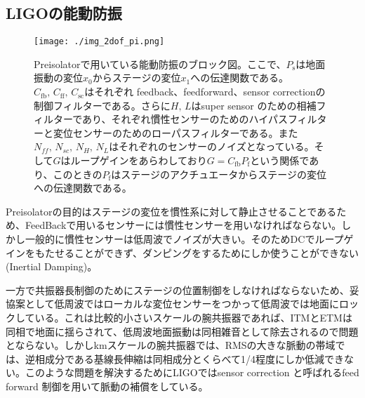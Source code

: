 \documentclass[a4paper,12pt]{jsarticle}
\begin{document}
\subsection{LIGOの能動防振}
\begin{figure}[H]
  \begin{center}
    \texttt{[image: ./img\_2dof\_pi.png]}
  \end{center}
  \caption{Preisolatorで用いている能動防振のブロック図。ここで、$P_{\mathrm{s}}$は地面振動の変位$x_0$からステージの変位$x_1$への伝達関数である。$C_{\mathrm{fb}},\,C_{\mathrm{ff}},\,C_{\mathrm{sc}}$はそれぞれ feedback、feedforward、sensor correctionの制御フィルターである。さらに$H,\,L$はsuper sensor のための相補フィルターであり、それぞれ慣性センサーのためのハイパスフィルターと変位センサーのためのローパスフィルターである。また$N_{ff},\,N_{sc},\,N_{H},\,N_{L}$はそれぞれのセンサーのノイズとなっている。そして$G$はループゲインをあらわしており$G=C_{\mathrm{fb}}P_{\mathrm{f}}$という関係であり、このときの$P_{\mathrm{f}}$はステージのアクチュエータからステージの変位への伝達関数である。}\label{img:img_2dof_pi}
\end{figure}

Preisolatorの目的はステージの変位を慣性系に対して静止させることであるため、FeedBackで用いるセンサーには慣性センサーを用いなければならない。しかし一般的に慣性センサーは低周波でノイズが大きい。そのためDCでループゲインをもたせることができず、ダンピングをするためにしか使うことができない(Inertial Damping)。

一方で共振器長制御のためにステージの位置制御をしなければならないため、妥協案として低周波ではローカルな変位センサーをつかって低周波では地面にロックしている。これは比較的小さいスケールの腕共振器であれば、ITMとETMは同相で地面に揺らされて、低周波地面振動は同相雑音として除去されるので問題とならない。しかしkmスケールの腕共振器では、RMSの大きな脈動の帯域では、逆相成分である基線長伸縮は同相成分とくらべて1/4程度にしか低減できない。このような問題を解決するためにLIGOではsensor correction と呼ばれるfeed forward 制御を用いて脈動の補償をしている\cite{matichard2015seismic}。
\end{document}
